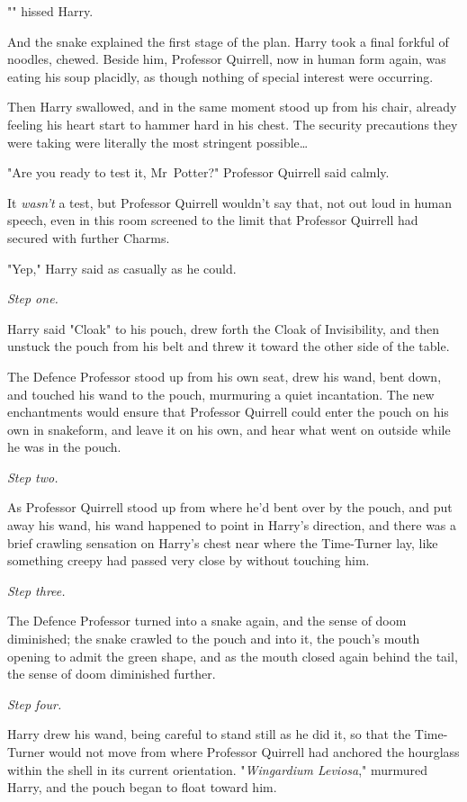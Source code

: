"" hissed Harry.

And the snake explained the first stage of the plan.
\later
Harry took a final forkful of noodles, chewed. Beside him, Professor Quirrell,
now in human form again, was eating his soup placidly, as though nothing of
special interest were occurring.

Then Harry swallowed, and in the same moment stood up from his chair, already
feeling his heart start to hammer hard in his chest. The security precautions
they were taking were literally the most stringent possible…

"Are you ready to test it, Mr~Potter?" Professor Quirrell said calmly.

It \emph{wasn’t} a test, but Professor Quirrell wouldn’t say that, not out loud
in human speech, even in this room screened to the limit that Professor
Quirrell had secured with further Charms.

"Yep," Harry said as casually as he could.

\emph{Step one.}

Harry said "Cloak" to his pouch, drew forth the Cloak of Invisibility, and then
unstuck the pouch from his belt and threw it toward the other side of the table.

The Defence Professor stood up from his own seat, drew his wand, bent down, and
touched his wand to the pouch, murmuring a quiet incantation. The new
enchantments would ensure that Professor Quirrell could enter the pouch on his
own in snakeform, and leave it on his own, and hear what went on outside while
he was in the pouch.

\emph{Step two.}

As Professor Quirrell stood up from where he’d bent over by the pouch, and put
away his wand, his wand happened to point in Harry’s direction, and there was a
brief crawling sensation on Harry’s chest near where the Time-Turner lay, like
something creepy had passed very close by without touching him.

\emph{Step three.}

The Defence Professor turned into a snake again, and the sense of doom
diminished; the snake crawled to the pouch and into it, the pouch’s mouth
opening to admit the green shape, and as the mouth closed again behind the
tail, the sense of doom diminished further.

\emph{Step four.}

Harry drew his wand, being careful to stand still as he did it, so that the
Time-Turner would not move from where Professor Quirrell had anchored the
hourglass within the shell in its current orientation. "\emph{Wingardium
Leviosa}," murmured Harry, and the pouch began to float toward him.

